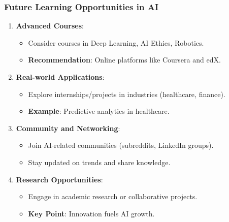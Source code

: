 \documentclass[aspectratio=169]{beamer}
\begin{document}
\begin{frame}[fragile]
    \frametitle{Future Learning Opportunities in AI}
    
    \begin{enumerate}
        \item \textbf{Advanced Courses}:
        \begin{itemize}
            \item Consider courses in Deep Learning, AI Ethics, Robotics.
            \item \textbf{Recommendation}: Online platforms like Coursera and edX.
        \end{itemize}
        
        \item \textbf{Real-world Applications}:
        \begin{itemize}
            \item Explore internships/projects in industries (healthcare, finance).
            \item \textbf{Example}: Predictive analytics in healthcare.
        \end{itemize}
        
        \item \textbf{Community and Networking}:
        \begin{itemize}
            \item Join AI-related communities (subreddits, LinkedIn groups).
            \item Stay updated on trends and share knowledge.
        \end{itemize}
        
        \item \textbf{Research Opportunities}:
        \begin{itemize}
            \item Engage in academic research or collaborative projects.
            \item \textbf{Key Point}: Innovation fuels AI growth.
        \end{itemize}
    \end{enumerate}
\end{frame}
\end{document}
